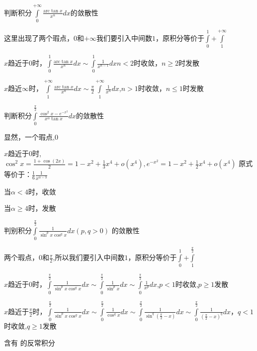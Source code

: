 \documentclass[lang=cn,10pt]{elegantbook}
\begin{document}
\begin{example}
	判断积分$\int\limits_0^{+\infty}{\frac{\mathrm{arc}\tan x}{x^n}dx}$的敛散性
\end{example}
\begin{solution}
	
	这里出现了两个瑕点，$0$和$+\infty$我们要引入中间数$1$，原积分等价于$\int\limits_0^1{+\int\limits_1^{+\infty}}$
	
	$x$趋近于$0$时，$\int\limits_0^1{\frac{\mathrm{arc}\tan x}{x^n}dx\sim \int\limits_0^1{\frac{1}{x^{n-1}}dx}}$$n<2$时收敛，$n\ge2$时发散
	
	$x$趋近$\infty$时，$\int\limits_1^{+\infty}{\frac{\mathrm{arc}\tan x}{x^n}dx\sim \frac{\pi}{2}\int\limits_1^{+\infty}{\frac{1}{x^n}dx}}$,$n>1$时收敛，$n\le1$时发散
\end{solution}
\begin{example}
	判断积分$\int\limits_0^{\frac{\pi}{2}}{\frac{\cos ^2x-e^{-x^2}}{x^{\alpha}\tan x}dx}$的敛散性
\end{example}
\begin{solution}
	
	显然，一个瑕点,$0$
	
	$x$趋近于$0$时,$\cos ^2x=\frac{1+\cos \left( 2x \right)}{2}=1-x^2+\frac{1}{3}x^4+o\left( x^4 \right) ,e^{-x^2}=1-x^2+\frac{1}{2}x^4+o\left( x^4 \right) 
	$
	原式等价于：$\frac{1}{6}\frac{1}{x^{\alpha-3}}$
	
	当$\alpha<4$时，收敛
	
	当$\alpha\ge4$时，发散
	
\end{solution}
\begin{example}
	判别积分$\int\limits_0^{\frac{\pi}{2}}{\frac{1}{\sin ^px\cos ^qx}dx}\left( p,q>0 \right)$ 的敛散性
\end{example}
\begin{solution}
	
	两个瑕点，$0$和$\frac{\pi}{2}$,所以我们要引入中间数$1$，原积分等价于$\int\limits_0^1{+\int\limits_1^{\frac{\pi}{2}}{}}$
	
	$x$趋近于0时，$\int\limits_0^{\frac{\pi}{2}}{\frac{1}{\sin ^px\cos ^qx}dx}\sim \int\limits_0^{\frac{\pi}{2}}{\frac{1}{\sin ^px}dx\sim}\int\limits_0^{\frac{\pi}{2}}{\frac{1}{x^p}dx}
	$,$p<1$时收敛,$p\ge1$发散
	
	$x$趋近于$\frac{\pi}{2}$时，$\int\limits_0^{\frac{\pi}{2}}{\frac{1}{\sin ^px\cos ^qx}dx}\sim \int\limits_0^{\frac{\pi}{2}}{\frac{1}{\cos ^qx}dx\sim}\int\limits_0^{\frac{\pi}{2}}{\frac{1}{\sin ^q\left( \frac{\pi}{2}-x \right)}dx}\sim \int\limits_0^{\frac{\pi}{2}}{\frac{1}{\left( \frac{\pi}{2}-x \right) ^q}dx}
	$，$q<1$时收敛,$q\ge1$发散
\end{solution}
含有{\color{red} }的反常积分
\end{document}
